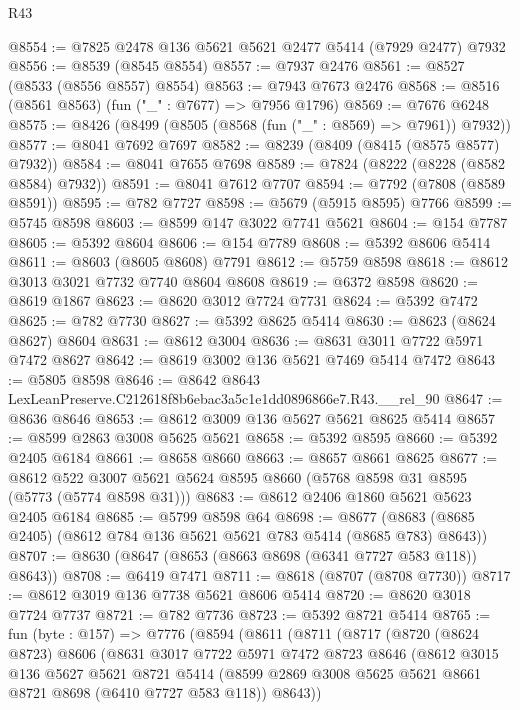 \begin{lexlean}{R43}
\begin{coremodule}
@8554 := @7825 @2478 @136 @5621 @5621 @2477 @5414 (@7929 @2477) @7932
@8556 := @8539 (@8545 @8554)
@8557 := @7937 @2476
@8561 := @8527 (@8533 (@8556 @8557) @8554)
@8563 := @7943 @7673 @2476
@8568 := @8516 (@8561 @8563) (fun ("_" : @7677) => @7956 @1796)
@8569 := @7676 @6248
@8575 := @8426 (@8499 (@8505 (@8568 (fun ("_" : @8569) => @7961)) @7932))
@8577 := @8041 @7692 @7697
@8582 := @8239 (@8409 (@8415 (@8575 @8577) @7932))
@8584 := @8041 @7655 @7698
@8589 := @7824 (@8222 (@8228 (@8582 @8584) @7932))
@8591 := @8041 @7612 @7707
@8594 := @7792 (@7808 (@8589 @8591))
@8595 := @782 @7727
@8598 := @5679 (@5915 @8595) @7766
@8599 := @5745 @8598
@8603 := @8599 @147 @3022 @7741 @5621
@8604 := @154 @7787
@8605 := @5392 @8604
@8606 := @154 @7789
@8608 := @5392 @8606 @5414
@8611 := @8603 (@8605 @8608) @7791
@8612 := @5759 @8598
@8618 := @8612 @3013 @3021 @7732 @7740 @8604 @8608
@8619 := @6372 @8598
@8620 := @8619 @1867
@8623 := @8620 @3012 @7724 @7731
@8624 := @5392 @7472
@8625 := @782 @7730
@8627 := @5392 @8625 @5414
@8630 := @8623 (@8624 @8627) @8604
@8631 := @8612 @3004
@8636 := @8631 @3011 @7722 @5971 @7472 @8627
@8642 := @8619 @3002 @136 @5621 @7469 @5414 @7472
@8643 := @5805 @8598
@8646 := @8642 @8643 LexLeanPreserve.C212618f8b6ebac3a5c1e1dd0896866e7.R43.__rel_90
@8647 := @8636 @8646
@8653 := @8612 @3009 @136 @5627 @5621 @8625 @5414
@8657 := @8599 @2863 @3008 @5625 @5621
@8658 := @5392 @8595
@8660 := @5392 @2405 @6184
@8661 := @8658 @8660
@8663 := @8657 @8661 @8625
@8677 := @8612 @522 @3007 @5621 @5624 @8595 @8660 (@5768 @8598 @31 @8595 (@5773 (@5774 @8598 @31)))
@8683 := @8612 @2406 @1860 @5621 @5623 @2405 @6184
@8685 := @5799 @8598 @64
@8698 := @8677 (@8683 (@8685 @2405) (@8612 @784 @136 @5621 @5621 @783 @5414 (@8685 @783) @8643))
@8707 := @8630 (@8647 (@8653 (@8663 @8698 (@6341 @7727 @583 @118)) @8643))
@8708 := @6419 @7471
@8711 := @8618 (@8707 (@8708 @7730))
@8717 := @8612 @3019 @136 @7738 @5621 @8606 @5414
@8720 := @8620 @3018 @7724 @7737
@8721 := @782 @7736
@8723 := @5392 @8721 @5414
@8765 := fun (byte : @157) =>
  @7776
    (@8594
      (@8611
        (@8711
          (@8717
            (@8720
              (@8624 @8723)
              @8606
              (@8631
                @3017
                @7722
                @5971
                @7472
                @8723
                @8646
                (@8612
                  @3015
                  @136
                  @5627
                  @5621
                  @8721
                  @5414
                  (@8599 @2869 @3008 @5625 @5621 @8661 @8721 @8698 (@6410 @7727 @583 @118))
                  @8643))

\end{coremodule}
\end{lexlean}
